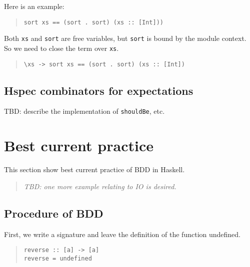 \documentclass[preprint]{sigplanconf}
\begin{document}
\noindent Here is an example:

\begin{quote}\small\begin{verbatim}
sort xs == (sort . sort) (xs :: [Int]))
\end{verbatim}\end{quote}

\noindent Both \verb|xs| and \verb|sort| are free variables, but
\verb|sort| is bound by the module context.  So we need to close the
term over \verb|xs|.

\begin{quote}\small\begin{verbatim}
\xs -> sort xs == (sort . sort) (xs :: [Int])
\end{verbatim}\end{quote}


\subsection{Hspec combinators for expectations}
\label{sec:hspec-comb}

TBD: describe the implementation of {\tt shouldBe}, etc.


\section{Best current practice}
\label{ref:Best-current-practice}

This section show best current practice of
BDD in Haskell.

\begin{quote}
    \emph{TBD: one more example relating to IO is desired.}
\end{quote}

\subsection{Procedure of BDD}

First, we write a signature and leave the definition of the function undefined.

\begin{quote}
\small
\begin{verbatim}
reverse :: [a] -> [a]
reverse = undefined
\end{verbatim}
\end{quote}
\end{document}
